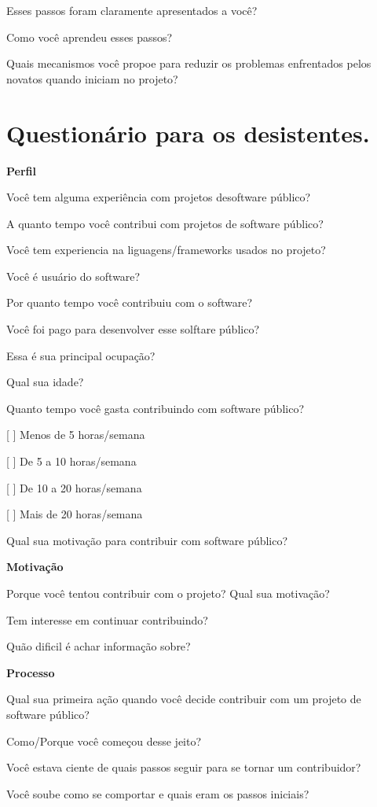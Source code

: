 \begin{anexosenv}
Esses passos foram claramente apresentados a você?

Como você aprendeu esses passos?

Quais mecanismos você propoe para reduzir os problemas enfrentados pelos novatos quando iniciam no projeto?


\chapter{Questionário para os desistentes.}
\label{anexo c}

\textbf{Perfil}

Você tem alguma experiência com projetos desoftware público?

A quanto tempo você contribui com projetos de software público?

Você tem experiencia na liguagens/frameworks usados no projeto?

Você é usuário do software?

Por quanto tempo você contribuiu com o software?

Você foi pago para desenvolver esse solftare público?

Essa é sua principal ocupação?

Qual sua idade?

Quanto tempo você gasta contribuindo com software público?

[ ] Menos de 5 horas/semana 

[ ] De 5 a 10 horas/semana

[ ] De 10 a 20 horas/semana

[ ] Mais de 20 horas/semana

Qual sua motivação para contribuir com software público?


\textbf{Motivação}

Porque você tentou contribuir com o projeto? Qual sua motivação?

Tem interesse em continuar contribuindo?

Quão dificil é achar informação sobre?


\textbf{Processo}

Qual sua primeira ação quando você decide contribuir com um projeto de software público?

Como/Porque você começou desse jeito?

Você estava ciente de quais passos seguir para se tornar um contribuidor?

Você soube como se comportar e quais eram os passos iniciais?


\end{anexosenv}
